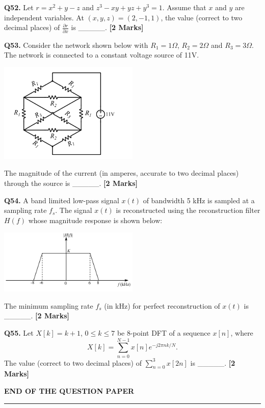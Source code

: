 \documentclass[11pt]{article}
\newcommand{\questionb}[2]{
    \noindent\textbf{Q#2.} #1 \hfill \textbf{[2 Marks]}
}
\begin{document}
\vspace{0.5cm}

\questionb{Let $r = x^2 + y - z$ and $z^3 - xy + yz + y^3 = 1$. Assume that $x$ and $y$ are independent variables. At $(x, y, z) = (2, -1, 1)$, the value (correct to two decimal places) of $\frac{\partial r}{\partial x}$ is \_\_\_\_\_.}{52}

\vspace{0.5cm}

\questionb{Consider the network shown below with $R_1 = 1\Omega$, $R_2 = 2\Omega$ and $R_3 = 3\Omega$. The network is connected to a constant voltage source of 11V.

\begin{center}
\includegraphics[width=0.5\textwidth]{figures/53.png}
\end{center}

The magnitude of the current (in amperes, accurate to two decimal places) through the source is \_\_\_\_\_.}{53}

\vspace{0.5cm}

\questionb{A band limited low-pass signal $x(t)$ of bandwidth 5 kHz is sampled at a sampling rate $f_s$. The signal $x(t)$ is reconstructed using the reconstruction filter $H(f)$ whose magnitude response is shown below:

\begin{center}
\includegraphics[width=0.5\textwidth]{figures/54.png}
\end{center}

The minimum sampling rate $f_s$ (in kHz) for perfect reconstruction of $x(t)$ is \_\_\_\_\_.}{54}

\vspace{0.5cm}

\questionb{Let $X[k] = k + 1$, $0 \leq k \leq 7$ be 8-point DFT of a sequence $x[n]$, where
\[
X[k] = \sum_{n=0}^{N-1} x[n] e^{-j2\pi nk/N}.
\]
The value (correct to two decimal places) of $\sum_{n=0}^{3} x[2n]$ is \_\_\_\_\_.}{55}

\vspace{0.5cm}

\vspace{5cm}
\begin{center}
\textbf{END OF THE QUESTION PAPER}
\rule{\textwidth}{0.5pt} %
\end{center}
\end{document}
